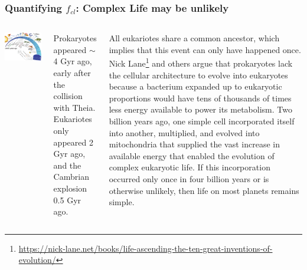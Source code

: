 \begin{frame}
\frametitle{Quantifying $f_{cl}$: Complex Life may be unlikely}

\begin{columns}

\includegraphics[scale=0.40]{evolutionlife}

Prokaryotes appeared $\sim$ 4 Gyr ago, early after the collision with Theia. Eukariotes only appeared 2 Gyr ago, and the Cambrian explosion 0.5 Gyr ago. 

 
All eukariotes share a common ancestor, which implies that this event can only have happened once. Nick Lane\footnote{\url{https://nick-lane.net/books/life-ascending-the-ten-great-inventions-of-evolution/}} and others argue that prokaryotes lack the cellular architecture to evolve into eukaryotes because a bacterium expanded up to eukaryotic proportions would have tens of thousands of times less energy available to power its metabolism. Two billion years ago, one simple cell incorporated itself into another, multiplied, and evolved into mitochondria that supplied the vast increase in available energy that enabled the evolution of complex eukaryotic life. If this incorporation occurred only once in four billion years or is otherwise unlikely, then life on most planets remains simple.

\end{columns}
\end{frame}


